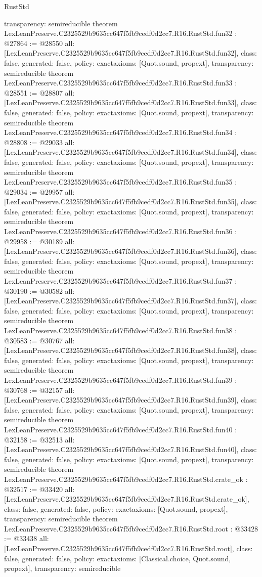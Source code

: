 \begin{lexlean}{RustStd}
\begin{coremodule}
{  transparency: semireducible
}
theorem LexLeanPreserve.C2325529b9635cc647f5fb9cedf0d2cc7.R16.RustStd.fun32 : @27864 := @28550 {
  all: [LexLeanPreserve.C2325529b9635cc647f5fb9cedf0d2cc7.R16.RustStd.fun32],
  class: false,
  generated: false,
  policy: exact{axioms: [Quot.sound, propext]},
  transparency: semireducible
}
theorem LexLeanPreserve.C2325529b9635cc647f5fb9cedf0d2cc7.R16.RustStd.fun33 : @28551 := @28807 {
  all: [LexLeanPreserve.C2325529b9635cc647f5fb9cedf0d2cc7.R16.RustStd.fun33],
  class: false,
  generated: false,
  policy: exact{axioms: [Quot.sound, propext]},
  transparency: semireducible
}
theorem LexLeanPreserve.C2325529b9635cc647f5fb9cedf0d2cc7.R16.RustStd.fun34 : @28808 := @29033 {
  all: [LexLeanPreserve.C2325529b9635cc647f5fb9cedf0d2cc7.R16.RustStd.fun34],
  class: false,
  generated: false,
  policy: exact{axioms: [Quot.sound, propext]},
  transparency: semireducible
}
theorem LexLeanPreserve.C2325529b9635cc647f5fb9cedf0d2cc7.R16.RustStd.fun35 : @29034 := @29957 {
  all: [LexLeanPreserve.C2325529b9635cc647f5fb9cedf0d2cc7.R16.RustStd.fun35],
  class: false,
  generated: false,
  policy: exact{axioms: [Quot.sound, propext]},
  transparency: semireducible
}
theorem LexLeanPreserve.C2325529b9635cc647f5fb9cedf0d2cc7.R16.RustStd.fun36 : @29958 := @30189 {
  all: [LexLeanPreserve.C2325529b9635cc647f5fb9cedf0d2cc7.R16.RustStd.fun36],
  class: false,
  generated: false,
  policy: exact{axioms: [Quot.sound, propext]},
  transparency: semireducible
}
theorem LexLeanPreserve.C2325529b9635cc647f5fb9cedf0d2cc7.R16.RustStd.fun37 : @30190 := @30582 {
  all: [LexLeanPreserve.C2325529b9635cc647f5fb9cedf0d2cc7.R16.RustStd.fun37],
  class: false,
  generated: false,
  policy: exact{axioms: [Quot.sound, propext]},
  transparency: semireducible
}
theorem LexLeanPreserve.C2325529b9635cc647f5fb9cedf0d2cc7.R16.RustStd.fun38 : @30583 := @30767 {
  all: [LexLeanPreserve.C2325529b9635cc647f5fb9cedf0d2cc7.R16.RustStd.fun38],
  class: false,
  generated: false,
  policy: exact{axioms: [Quot.sound, propext]},
  transparency: semireducible
}
theorem LexLeanPreserve.C2325529b9635cc647f5fb9cedf0d2cc7.R16.RustStd.fun39 : @30768 := @32157 {
  all: [LexLeanPreserve.C2325529b9635cc647f5fb9cedf0d2cc7.R16.RustStd.fun39],
  class: false,
  generated: false,
  policy: exact{axioms: [Quot.sound, propext]},
  transparency: semireducible
}
theorem LexLeanPreserve.C2325529b9635cc647f5fb9cedf0d2cc7.R16.RustStd.fun40 : @32158 := @32513 {
  all: [LexLeanPreserve.C2325529b9635cc647f5fb9cedf0d2cc7.R16.RustStd.fun40],
  class: false,
  generated: false,
  policy: exact{axioms: [Quot.sound, propext]},
  transparency: semireducible
}
theorem LexLeanPreserve.C2325529b9635cc647f5fb9cedf0d2cc7.R16.RustStd.crate_ok : @32517 := @33420 {
  all: [LexLeanPreserve.C2325529b9635cc647f5fb9cedf0d2cc7.R16.RustStd.crate_ok],
  class: false,
  generated: false,
  policy: exact{axioms: [Quot.sound, propext]},
  transparency: semireducible
}
theorem LexLeanPreserve.C2325529b9635cc647f5fb9cedf0d2cc7.R16.RustStd.root : @33428 := @33438 {
  all: [LexLeanPreserve.C2325529b9635cc647f5fb9cedf0d2cc7.R16.RustStd.root],
  class: false,
  generated: false,
  policy: exact{axioms: [Classical.choice, Quot.sound, propext]},
  transparency: semireducible
}


\end{coremodule}
\end{lexlean}
